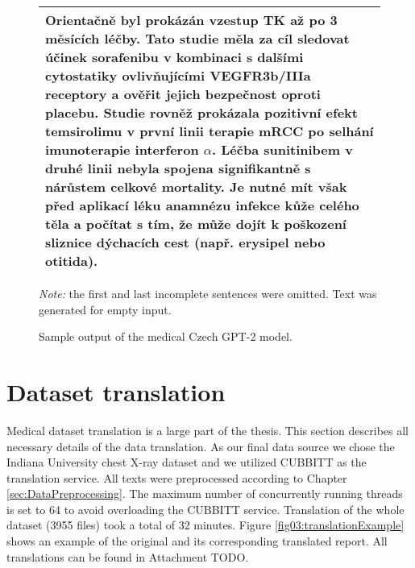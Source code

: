 \begin{figure}[htb]
\begin{tabular}{|l|}
{Orientačně byl prokázán vzestup TK až po 3 měsících léčby.\newline
Tato studie měla za cíl sledovat účinek sorafenibu v kombinaci s dalšími cytostatiky ovlivňujícími VEGFR3b/IIIa receptory a ověřit jejich bezpečnost oproti placebu. Studie rovněž prokázala pozitivní efekt temsirolimu v první linii terapie mRCC po selhání imunoterapie interferon $\alpha$. Léčba sunitinibem v druhé linii nebyla spojena signifikantně s nárůstem celkové mortality.\newline
Je nutné mít však před aplikací léku anamnézu infekce kůže celého těla a počítat s tím, že může dojít k poškození sliznice dýchacích cest (např. erysipel nebo otitida).\vspace{0.25em}}
\\ \hline
             \end{tabular}
        \caption{Sample output of the medical Czech GPT-2 model.}
	\label{fig02:gpt2MedExample}
\textit{Note:} the first and last incomplete sentences were omitted. Text was generated for empty input.
\end{figure}

\section{Dataset translation}
Medical dataset translation is a large part of the thesis. This section describes all necessary details of the data translation. As our final data source we chose the Indiana University chest X-ray dataset and we utilized CUBBITT as the translation service. All texts were preprocessed according to Chapter \ref{sec:DataPreprocessing}. The maximum number of concurrently running threads is set to 64 to avoid overloading the CUBBITT service. Translation of the whole dataset (3955 files) took a total of 32 minutes. Figure \ref{fig03:translationExample} shows an example of the original and its corresponding translated report. All translations can be found in Attachment TODO.

